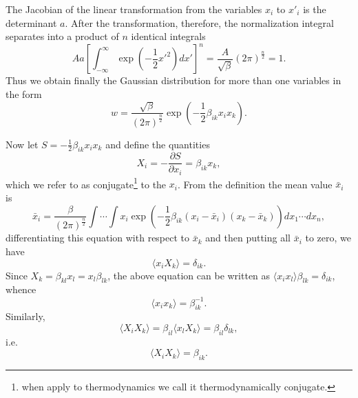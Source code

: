 \documentclass{book}
\newcommand{\average}[1]{\langle#1\rangle}
\numberwithin{equation}{section}
\begin{document}
The Jacobian of the linear transformation from the variables $x_i$ to
$x'_i$ is the determinant $a$. After the transformation, therefore,
the normalization integral separates into a product of $n$ identical
integrals
\begin{equation}
  Aa\left[\int_{-\infty}^\infty\exp\left(-\frac{1}{2}x'^2\right)dx'\right]^n
  =\frac{A}{\sqrt{\beta}}(2\pi)^{\frac{n}{2}}=1.
\end{equation}
Thus we obtain finally the Gaussian distribution for more than one
variables in the form
\begin{equation}
  w=\frac{\sqrt{\beta}}{(2\pi)^{\frac{n}{2}}}\exp\left(
  -\frac{1}{2}\beta_{ik}x_ix_k\right).
\end{equation}

Now let $S=-\frac{1}{2}\beta_{ik}x_ix_k$ and define the quantities
\begin{equation}
  X_i=-\frac{\partial S}{\partial x_i}=\beta_{ik}x_k,
\end{equation}
which we refer to as conjugate\footnote{when apply to thermodynamics
  we call it thermodynamically conjugate.} to the $x_i$. From the definition 
the mean value $\bar{x}_i$ is
\begin{equation}
  \bar{x}_i=\frac{\beta}{(2\pi)^{\frac{n}{2}}}\int\cdots\int
  x_i\exp\left(-\frac{1}{2}\beta_{ik}(x_i-\bar{x}_i)
  (x_k-\bar{x}_k)\right)dx_1\cdots dx_n,
\end{equation}
differentiating this equation with respect to $\bar{x}_k$ and then
putting all $\bar{x}_i$ to zero, we have
\begin{equation}
  \average{x_iX_k}=\delta_{ik}.
\end{equation}
Since $X_k=\beta_{kl}x_l=x_l\beta_{lk}$, the above equation can be written as 
$\average{x_ix_l}\beta_{lk}=\delta_{ik}$, whence 
\begin{equation}
  \average{x_ix_k}=\beta^{-1}_{ik}.
\end{equation}
Similarly,
\begin{equation}
  \average{X_iX_k}=\beta_{il}\average{x_lX_k}=\beta_{il}\delta_{lk},
\end{equation}
i.e.
\begin{equation}
  \average{X_iX_k}=\beta_{ik}.
\end{equation}
\end{document}
